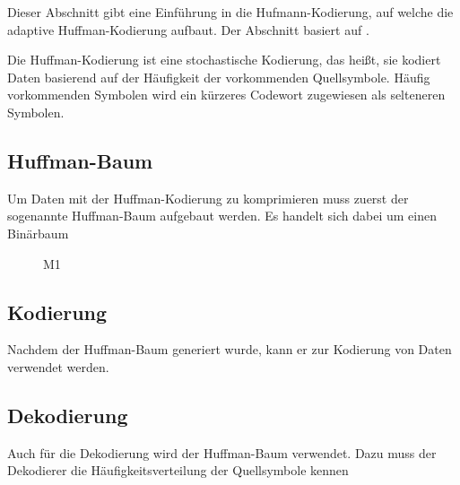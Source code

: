 \documentclass[twoside,11pt,a4paper]{article}
\theoremstyle{break}
\begin{document}
Dieser Abschnitt gibt eine Einführung in die Hufmann-Kodierung, auf welche die
adaptive Huffman-Kodierung aufbaut. Der Abschnitt basiert auf \cite[S.
214-228]{Salomon:2010}.

Die Huffman-Kodierung ist eine stochastische Kodierung, das heißt, sie kodiert
Daten basierend auf der Häufigkeit der vorkommenden Quellsymbole. Häufig
vorkommenden Symbolen wird ein kürzeres Codewort zugewiesen als selteneren
Symbolen.

\subsection{Huffman-Baum}

Um Daten mit der Huffman-Kodierung zu komprimieren muss zuerst der sogenannte
Huffman-Baum aufgebaut werden. Es handelt sich dabei um einen Binärbaum

\begin{figure}
\centering
{}
\caption{M1} \label{fig:M1}
\end{figure}

\subsection{Kodierung}
Nachdem der Huffman-Baum generiert wurde, kann er zur Kodierung von Daten
verwendet werden.

\subsection{Dekodierung}
Auch für die Dekodierung wird der Huffman-Baum verwendet. Dazu muss der
Dekodierer die Häufigkeitsverteilung der Quellsymbole kennen
\end{document}
